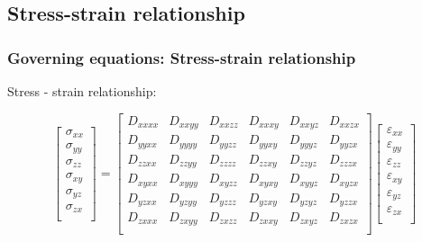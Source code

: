 \documentclass[beamer]{beamer}
\begin{document}
\subsection{Stress-strain relationship}
\begin{frame}
\frametitle{Governing equations: Stress-strain relationship}
Stress - strain relationship: 

\begin{equation*}
	\begin{bmatrix}
	\sigma_{xx} \\
	\sigma_{yy} \\
	\sigma_{zz} \\
	\sigma_{xy} \\
	\sigma_{yz} \\
	\sigma_{zx} \\
	\end{bmatrix} %
	= %
	\begin{bmatrix}
	D_{xxxx} & D_{xxyy} & D_{xxzz} & D_{xxxy} &   D_{xxyz} & D_{xxzx}\\
	D_{yyxx} & D_{yyyy} & D_{yyzz} & D_{yyxy} & D_{yyyz} & D_{yyzx}\\
	D_{zzxx} & D_{zzyy} & D_{zzzz} & D_{zzxy} & D_{zzyz} & D_{zzzx}\\
	D_{xyxx} & D_{xyyy} & D_{xyzz} & D_{xyxy} &   D_{xyyz} & D_{xyzx}\\
	D_{yzxx} & D_{yzyy} & D_{yzzz} & D_{yzxy} & D_{yzyz} & D_{yzzx}\\
	D_{zxxx} & D_{zxyy} & D_{zxzz} & D_{zxxy} & D_{zxyz} & D_{zxzx}\\
	\end{bmatrix} %
	\begin{bmatrix}
	\varepsilon_{xx} \\
	\varepsilon_{yy} \\
	\varepsilon_{zz} \\
	\varepsilon_{xy} \\
	\varepsilon_{yz} \\
	\varepsilon_{zx} \\
	\end{bmatrix}
\end{equation*}
\end{frame}
\end{document}
